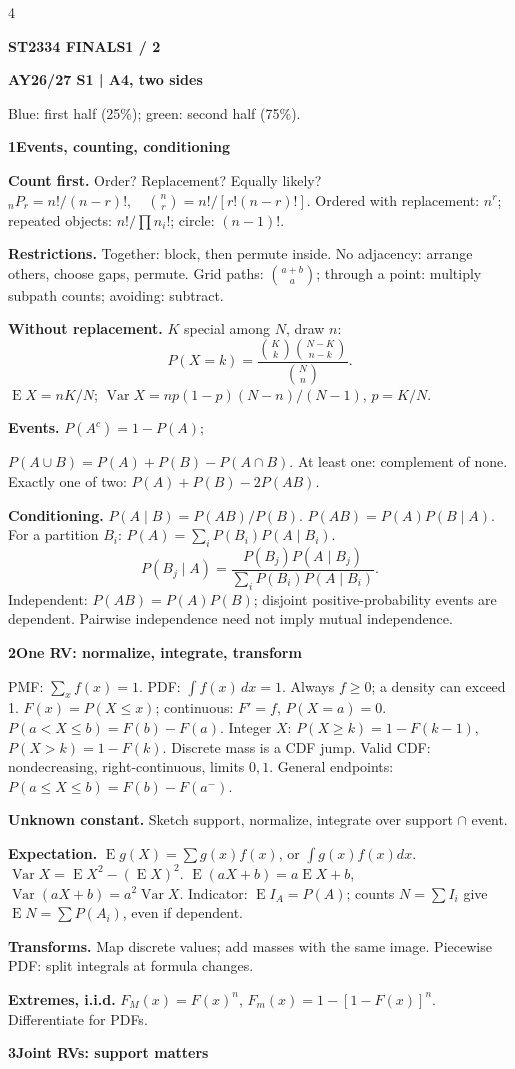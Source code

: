 \documentclass[a4paper,landscape]{article}
\newcommand{\head}[2][late]{\par\vspace{3pt}\noindent\colorbox{#1}{\parbox{\dimexpr\linewidth-6pt}{\color{white}\bfseries #2}}\par\vspace{1pt}}
\newcommand{\cue}[1]{\par\textbf{#1}\enspace}
\newcommand{\E}{\operatorname{E}}
\newcommand{\V}{\operatorname{Var}}
\begin{document}
\fontsize{7.4}{8.3}\selectfont
\sffamily\raggedright
\setlength{\abovedisplayskip}{2pt}
\setlength{\belowdisplayskip}{2pt}
\setlength{\abovedisplayshortskip}{1pt}
\setlength{\belowdisplayshortskip}{1pt}
\begin{multicols*}{4}
\head[early]{ST2334 FINALS\hfill 1 / 2}
\textbf{AY26/27 S1 | A4, two sides}\par
Blue: first half (25\%); green: second half (75\%).
\head[early]{1\quad Events, counting, conditioning}
\cue{Count first.} Order? Replacement? Equally likely?
\( {}_nP_r=n!/(n-r)!,\quad {n\choose r}=n!/[r!(n-r)!]\).
Ordered with replacement: \(n^r\); repeated objects: \(n!/\prod n_i!\); circle: \((n-1)!\).
\cue{Restrictions.} Together: block, then permute inside. No adjacency: arrange others, choose gaps, permute. Grid paths: \({a+b\choose a}\); through a point: multiply subpath counts; avoiding: subtract.
\cue{Without replacement.} \(K\) special among \(N\), draw \(n\):
\[P(X=k)=\frac{{K\choose k}{N-K\choose n-k}}{{N\choose n}}.\]
\(\E X=nK/N\); \(\V X=np(1-p)(N-n)/(N-1)\), \(p=K/N\).
\cue{Events.} \(P(A^c)=1-P(A)\);\par
\(P(A\cup B)=P(A)+P(B)-P(A\cap B)\).
At least one: complement of none. Exactly one of two: \(P(A)+P(B)-2P(AB)\).
\cue{Conditioning.} \(P(A\mid B)=P(AB)/P(B)\).
\(P(AB)=P(A)P(B\mid A)\). For a partition \(B_i\):
\(P(A)=\sum_iP(B_i)P(A\mid B_i)\).
\[
 P(B_j\mid A)=\frac{P(B_j)P(A\mid B_j)}{\sum_iP(B_i)P(A\mid B_i)}.\]
Independent: \(P(AB)=P(A)P(B)\); disjoint positive-probability events are dependent. Pairwise independence need not imply mutual independence.
\head[early]{2\quad One RV: normalize, integrate, transform}
PMF: \(\sum_x f(x)=1\). PDF: \(\int f(x)\,dx=1\). Always \(f\ge0\); a density can exceed 1.
\(F(x)=P(X\le x)\); continuous: \(F'=f\), \(P(X=a)=0\).
\(P(a<X\le b)=F(b)-F(a)\).
Integer \(X\): \(P(X\ge k)=1-F(k-1)\), \(P(X>k)=1-F(k)\). Discrete mass is a CDF jump.
Valid CDF: nondecreasing, right-continuous, limits \(0,1\). General endpoints: \(P(a\le X\le b)=F(b)-F(a^-)\).
\cue{Unknown constant.} Sketch support, normalize, integrate over support \(\cap\) event.
\cue{Expectation.} \(\E g(X)=\sum g(x)f(x)\), or \(\int g(x)f(x)dx\). \(\V X=\E X^2-(\E X)^2\).
\(\E(aX+b)=a\E X+b\), \(\V(aX+b)=a^2\V X\).
Indicator: \(\E I_A=P(A)\); counts \(N=\sum I_i\) give \(\E N=\sum P(A_i)\), even if dependent.
\cue{Transforms.} Map discrete values; add masses with the same image. Piecewise PDF: split integrals at formula changes.
\cue{Extremes, i.i.d.} \(F_M(x)=F(x)^n\), \(F_m(x)=1-[1-F(x)]^n\). Differentiate for PDFs.
\head[early]{3\quad Joint RVs: support matters}

\end{multicols*}
\end{document}
